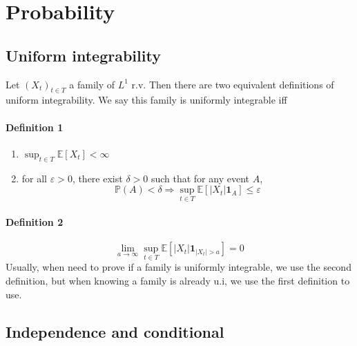 \documentclass[a4paper,10pt]{article}
\begin{document}
\section{Probability}
\subsection{Uniform integrability}
Let $(X_t)_{t\in T}$ a family of $L^1$ r.v. Then there are two equivalent definitions of uniform integrability. We say this family is uniformly integrable iff
\paragraph{Definition 1}
\begin{enumerate}[i]
 \item $\sup_{t\in T} \mathbb{E}[ X_t ] < \infty$
 \item for all $\varepsilon >0$, there exist $\delta>0$ such that for any event $A$,
 \[   \mathbb{P}(A) <\delta \Longrightarrow \sup_{t\in T} \mathbb{E}[|X_t|\mathbf{1}_{A}] \leq \varepsilon \]
\end{enumerate}
\paragraph{Definition 2}
\[
\lim_{a\rightarrow \infty} \sup_{t\in T} \mathbb{E}[|X_t|\mathbf{1}_{|X_t|>a}] = 0
\]
Usually, when need to prove if a family is uniformly integrable, we use the second definition, but when knowing a family is already u.i, we use the first definition to use.


\subsection{Independence and conditional}
\end{document}
